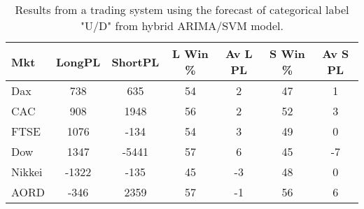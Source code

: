 \begin{table}[ht]
\centering
\caption[Results from a trading system using the forecast of categorical label "U/D" from hybrid ARIMA/SVM model]{Results from a trading system using the forecast of categorical label "U/D" from hybrid ARIMA/SVM model.} 
\label{tab:chp_ts:pUD_CAT_arima_svm_sys_ch6}
\begin{tabular}{lcccccc}
  \toprule Mkt & LongPL & ShortPL & L Win \% & Av L PL & S Win \% & Av S PL \\ 
  \midrule Dax & 738 & 635 & 54 & 2 & 47 & 1 \\ 
  CAC & 908 & 1948 & 56 & 2 & 52 & 3 \\ 
  FTSE & 1076 & -134 & 54 & 3 & 49 & 0 \\ 
  Dow & 1347 & -5441 & 57 & 6 & 45 & -7 \\ 
  Nikkei & -1322 & -135 & 45 & -3 & 48 & 0 \\ 
  AORD & -346 & 2359 & 57 & -1 & 56 & 6 \\ 
   \bottomrule \end{tabular}
\end{table}
